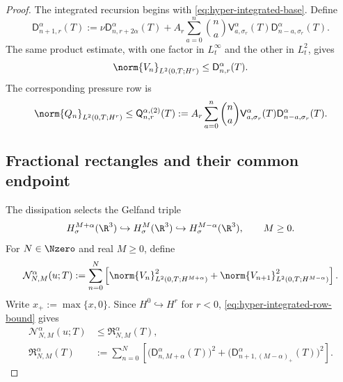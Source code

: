 \begin{proof}
The integrated recursion begins with
\eqref{eq:hyper-integrated-base}.  Define
\begin{equation}
 \mathsf D_{n+1,r}^\alpha(T)
 :=\nu\mathsf D_{n,r+2\alpha}^\alpha(T)
 +A_r\sum_{a=0}^n\binom na
   \mathsf V_{a,\sigma_r}^\alpha(T)
   \mathsf D_{n-a,\sigma_r}^\alpha(T).
 \label{eq:hyper-integrated-recursion}
\end{equation}
The same product estimate, with one factor in \(L_t^\infty\) and the other
in \(L_t^2\), gives
\begin{equation}
 \norm{V_n}_{L^2(0,T;H^r)}
 \le\mathsf D_{n,r}^\alpha(T).
 \label{eq:hyper-integrated-row-bound}
\end{equation}
The corresponding pressure row is
\begin{equation}
 \norm{Q_n}_{L^2(0,T;H^r)}
 \le\mathsf Q_{n,r}^{\alpha,(2)}(T)
 :=A_r\sum_{a=0}^n\binom na
   \mathsf V_{a,\sigma_r}^\alpha(T)
   \mathsf D_{n-a,\sigma_r}^\alpha(T).
 \label{eq:hyper-integrated-pressure}
\end{equation}

\subsection{Fractional rectangles and their common endpoint}

The dissipation selects the Gelfand triple
\begin{equation}
 H^{M+\alpha}_\sigma(\R^3)
 \hookrightarrow H^M_\sigma(\R^3)
 \hookrightarrow H^{M-\alpha}_\sigma(\R^3),
 \qquad M\ge0.
 \label{eq:hyper-gelfand-triple}
\end{equation}
For \(N\in\Nzero\) and real \(M\ge0\), define
\begin{equation}
 \mathcal N_{N,M}^\alpha(u;T)
 :=\sum_{n=0}^N\left[
  \norm{V_n}_{L^2(0,T;H^{M+\alpha})}^2
  +\norm{V_{n+1}}_{L^2(0,T;H^{M-\alpha})}^2
 \right].
 \label{eq:hyper-rectangle-norm}
\end{equation}
Write \(x_+:=\max\{x,0\}\).  Since \(H^0\hookrightarrow H^r\) for
\(r<0\), \eqref{eq:hyper-integrated-row-bound} gives
\begin{align}
 \mathcal N_{N,M}^\alpha(u;T)
 &\le\mathfrak R_{N,M}^\alpha(T),
 \label{eq:hyper-rectangle-bound}\\
 \mathfrak R_{N,M}^\alpha(T)
 &:=\sum_{n=0}^N\left[
  \bigl(\mathsf D_{n,M+\alpha}^\alpha(T)\bigr)^2
  +\bigl(\mathsf D_{n+1,(M-\alpha)_+}^\alpha(T)\bigr)^2
 \right].
 \label{eq:hyper-rectangle-envelope}
\end{align}


\end{proof}
